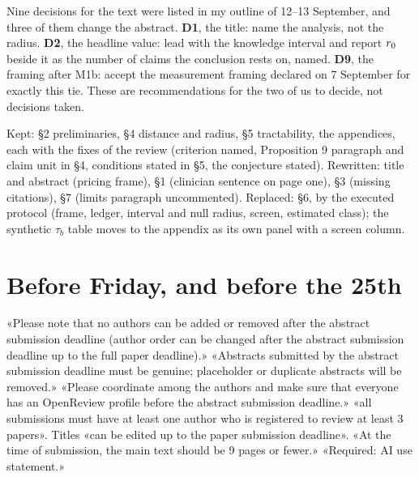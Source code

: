 Nine decisions for the text were listed in my outline of 12--13 September, and three of them change the
abstract. \textbf{D1}, the title: name the analysis, not the radius. \textbf{D2}, the headline value: lead
with the knowledge interval and report $r_{0}$ beside it as the number of claims the conclusion rests on,
named. \textbf{D9}, the framing after M1b: accept the measurement framing declared on 7 September for
exactly this tie. These are recommendations for the two of us to decide, not decisions taken.

%
{Kept: \S2 preliminaries, \S4 distance and radius, \S5 tractability, the appendices, each with the fixes of
the review (criterion named, Proposition 9 paragraph and claim unit in \S4, conditions stated in \S5, the
conjecture stated). Rewritten: title and abstract (pricing frame), \S1 (clinician sentence on page one),
\S3 (missing citations), \S7 (limits paragraph uncommented). Replaced: \S6, by the executed protocol
(frame, ledger, interval and null radius, screen, estimated class); the synthetic $\tau_b$ table moves to
the appendix as its own panel with a screen column.}

\begin{antes}
\end{antes}

\section{Before Friday, and before the 25th}

\begin{fonte}
«Please note that no authors can be added or removed after the abstract submission deadline (author order
can be changed after the abstract submission deadline up to the full paper deadline).» «Abstracts submitted
by the abstract submission deadline must be genuine; placeholder or duplicate abstracts will be removed.»
«Please coordinate among the authors and make sure that everyone has an OpenReview profile before the
abstract submission deadline.» «all submissions must have at least one author who is registered to review
at least 3 papers». Titles «can be edited up to the paper submission deadline». «At the time of submission,
the main text should be 9 pages or fewer.» «Required: AI use statement.»
\end{fonte}

